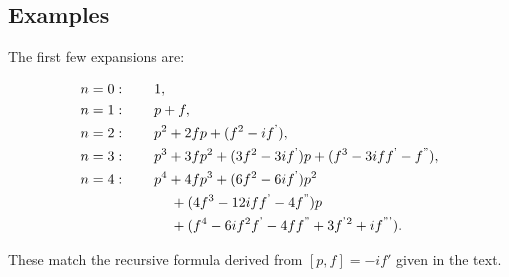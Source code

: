 \documentclass{book}
\newcommand{\tmrsup}[1]{\textsuperscript{#1}}
\begin{document}
\subsection{Examples}

The first few expansions are:

\begin{alignat}{2}
  n=0 & : \qquad 1,\\
  n=1 & : \qquad p+f,\\
  n=2 & : \qquad p\tmrsup{2}+2 f p+ (f\tmrsup{2}-i f\tmrsup{'}),\\
  n=3 & : \qquad p\tmrsup{3}+3 f p\tmrsup{2}+ (3 f\tmrsup{2}-3 i f\tmrsup{'}) 
  p+ (f\tmrsup{3}-3 i f f\tmrsup{'}-f\tmrsup{''}),\\
  n=4 & : \qquad p\tmrsup{4}+4 f p\tmrsup{3}+ (6 f\tmrsup{2}-6 i f\tmrsup{'}) 
  p\tmrsup{2}{\nonumber}\\
  & \qquad\qquad + (4 f\tmrsup{3}-12 i f f\tmrsup{'}-4 f\tmrsup{''}) 
  p{\nonumber}\\
  & \qquad\qquad + (f\tmrsup{4}-6 i f\tmrsup{2} f\tmrsup{'}-4 f
  f\tmrsup{''}+3 f\tmrsup{'}\tmrsup{2}+i f\tmrsup{'''})  .
\end{alignat}

These match the recursive formula derived from $[p, f] = - if'$ given in the
text.
\end{document}
